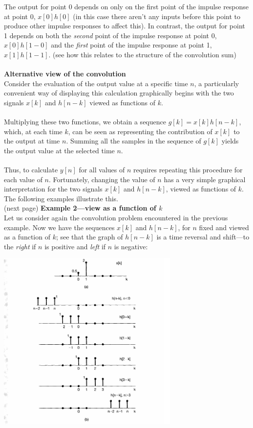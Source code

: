 \documentclass{report}
\begin{document}
The output for point 0 depends on only on the first point of the impulse response at point 0, $x[0]h[0]$ 
(in this case there aren't any inputs before this point to produce other impulse responses to affect this). In contrast, the
output for point 1 depends on both the \textit{second} point of the impulse response at point 0, $x[0]h[1-0]$ and the 
\textit{first} point of the impulse response at point 1, $x[1]h[1-1]$. (see how this relates to the structure of the convolution sum)\\
\vspace{1mm}\\
\textbf{Alternative view of the convolution}\\
Consider the evaluation of the output value at a specific time $n$, a particularly convenient way of displaying this calculation
graphically begins with the two signals $x[k]$ and
$h[n-k]$ viewed as functions of $k$.\\
\vspace{1mm}\\
Multiplying these two functions, we obtain a sequence $g[k]=x[k]h[n-k]$, which, at each time $k$, can be seen as representing
the contribution of $x[k]$ to the output at time $n$. 
Summing all the samples in the sequence of $g[k]$ yields the output value at the selected time $n$.\\
\vspace{1mm}\\
Thus, to calculate $y[n]$ for all values of $n$ requires repeating this procedure for each value of $n$. Fortunately, changing
the value of $n$ has a very simple graphical interpretation for
the two signals $x[k]$ and $h[n-k]$, viewed as functions of $k$.
The following examples illustrate this.\\
(next page)\newpage
\noindent\textbf{Example 2---view as a function of $k$}\\
Let us consider again the convolution problem encountered in the previous example. Now we have the sequences $x[k]$ and 
$h[n-k]$, for $n$ fixed and viewed as a function of $k$; see that
the graph of $h[n-k]$ is a time reversal and shift---to the \textit{right} if $n$ is positive and \textit{left} if $n$ 
is negative:
\begin{center}
\includegraphics[width=9cm]{a22}\\
\end{center}
\end{document}
